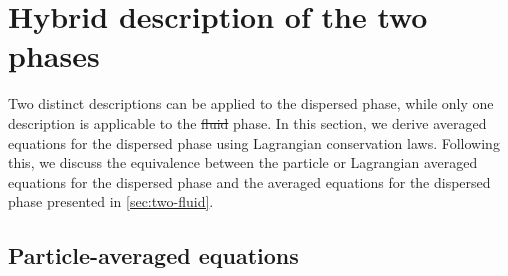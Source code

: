 \documentclass[11pt]{My_preprint}
\providecommand{\DIFadd}[1]{{\protect\color{blue}\uwave{#1}}} %
\providecommand{\DIFdel}[1]{{\protect\color{red}\sout{#1}}}                      %
\providecommand{\DIFaddbegin}{} %
\providecommand{\DIFaddend}{} %
\providecommand{\DIFdelbegin}{} %
\providecommand{\DIFdelend}{} %
\begin{document}
 

\section{Hybrid description of the two phases}
\label{sec:averaged_eq}

Two distinct descriptions can be applied to the dispersed phase, while only one description is applicable to the \DIFdelbegin \DIFdel{fluid }\DIFdelend \DIFaddbegin \DIFadd{continuous }\DIFaddend phase. 
In this section, we derive averaged equations for the dispersed phase using Lagrangian conservation laws. 
Following this, we  discuss the equivalence between the particle or Lagrangian averaged equations for the dispersed phase and the averaged equations for the dispersed phase presented in \ref{sec:two-fluid}.




\subsection{Particle-averaged equations}
\end{document}
